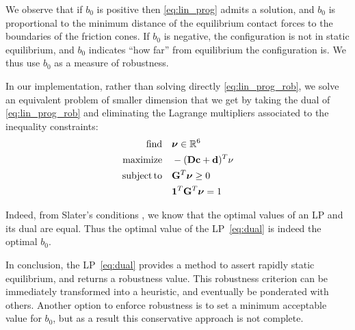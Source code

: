 We observe that if $b_0$ is positive then \eqref{eq:lin_prog} admits a solution, and $b_0$ is proportional to the minimum distance of the equilibrium contact forces to the boundaries of the friction cones.
If $b_0$ is negative, the configuration is not in static equilibrium, and $b_0$ indicates ``how far'' from equilibrium the configuration is. We thus use $b_0$ as a measure of robustness.

In our implementation, rather than solving directly \eqref{eq:lin_prog_rob}, we solve an equivalent problem of smaller dimension that we get by taking the dual of \eqref{eq:lin_prog_rob} and eliminating the Lagrange multipliers associated to the inequality constraints:
\begin{equation} \label{eq:dual} \begin{aligned}
\find \quad & \bm{\nu} \in \Rv{6}\\
\maximize  \quad & -(\mathbf{D} \mathbf{c} + \mathbf{d})^T \nu \\
\st \quad &\mathbf{G}^T \bm{\nu} \ge 0 \\
& \mathbf{1}^T \mathbf{G}^T \bm{\nu} = 1 \\
\end{aligned} \end{equation}

Indeed, from Slater's conditions \citep{Boyd:2004:CO:993483}, we know that the optimal values of an LP and its dual are equal. Thus the optimal value of the LP~\eqref{eq:dual} is indeed the optimal $b_0$.

In conclusion, the LP~\eqref{eq:dual} provides a method to assert rapidly static equilibrium, and returns a robustness value.
This robustness criterion can be immediately transformed into a heuristic, and eventually be ponderated with others.
Another option to enforce robustness is to set a minimum acceptable value for $b_0$, but as a result this conservative approach is not complete.
